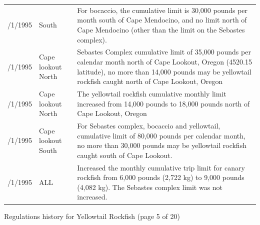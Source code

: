 \documentclass[12pt,]{article}
\begin{document}
\begin{tabular}{>{\centering}p{.60in}>{\centering}p{1.0in}>{\raggedright}p{4.20in}}
  1/1/1995 & 4030 South & For bocaccio, the cumulative limit is 30,000 pounds per month south of Cape Mendocino, and no limit north of Cape Mendocino (other than the limit on the Sebastes complex).   \\ 
  1/1/1995 & Cape lookout North & Sebastes Complex cumulative limit of 35,000 pounds per calendar month north of Cape Lookout, Oregon (4520.15 latitude), no more than 14,000 pounds may be yellowtail rockfish caught north of Cape Lookout, Oregon \\ 
  5/1/1995 & Cape lookout North & The yellowtail rockfish cumulative monthly limit increased from 14,000 pounds to 18,000 pounds north of Cape Lookout, Oregon \\ 
  5/1/1995 & Cape lookout South & For Sebastes complex, bocaccio  and yellowtail,  cumulative limit of 80,000 pounds per calendar month, no more than 30,000 pounds may be yellowtail rockfish caught south of Cape Lookout. \\ 
  8/1/1995 & ALL & Increased the monthly cumulative trip limit for canary rockfish from 6,000 pounds (2,722 kg) to 9,000 pounds (4,082 kg).  The Sebastes complex limit was not increased. \\ 
   \hline
\end{tabular}

\endgroup
\newpage
Regulations history for Yellowtail Rockfish (page 5 of 20)
\begingroup\fontsize{9pt}{10pt}\selectfont
\end{document}
